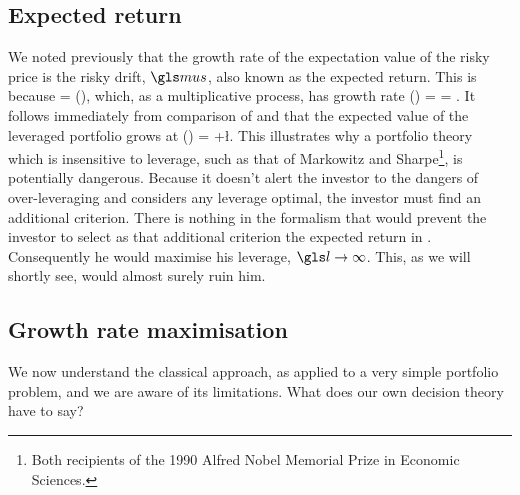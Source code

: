 \subsection{Expected return}
We noted previously that the growth rate of the expectation value of the risky price is the risky drift, $\mus$, also known as the expected return. This is because
\be
\ave{\xone(\tn+\Dt)} = \ave{\xone(\tn)}\exp(\mus \Dt),
\ee
which, as a multiplicative process, has growth rate
\be
\gm(\ave{\xone}) = \frac{\D\ln\ave{\xone}}{\Dt} = \mus.
\ee
It follows immediately from comparison of  and  that the expected value of the leveraged portfolio grows at
\be
\gm(\ave{\xl}) = \mur+\l\mue.
\ee
This illustrates why a portfolio theory which is insensitive to leverage, such as that of Markowitz and Sharpe\footnote{Both recipients of the 1990 Alfred Nobel Memorial Prize in Economic Sciences.}, is potentially dangerous. Because it doesn't alert the investor to the dangers of over-leveraging and considers any leverage optimal, the investor must find an additional criterion. There is nothing in the formalism that would prevent the investor to select as that additional criterion the expected return in . Consequently he would maximise his leverage, $\l\to\infty$. This, as we will shortly see, would almost surely ruin him.

\subsection{Growth rate maximisation}
We now understand the classical approach, as applied to a very simple portfolio problem, and we are aware of its limitations. What does our own decision theory have to say?

